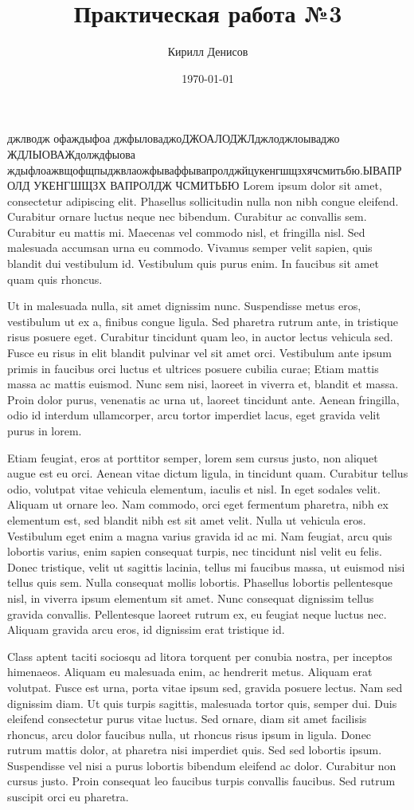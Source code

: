 \documentclass[a4paper,14pt]{extarticle}
\author{Кирилл Денисов}
\title{Практическая работа №3}
\date{\today}
\newcommand{\pathToCommonFolder}{/home/denilai/Desktop/LaTeX/Common}
\begin{document}
	\thispagestyle{empty}
	
	
	\newpage
	\tableofcontents
	\newpage
	
	джлводж офаждыфоа джфыловаджоДЖОАЛОДЖЛджлоджлоываджо ЖДЛЫОВАЖдолждфыова ждыфлоажвщофщпыджвлаожфываффывапролджйцукенгшщзхячсмитьбю.ЫВАПРОЛД УКЕНГШЩЗХ ВАПРОЛДЖ ЧСМИТЬБЮ 
Lorem ipsum dolor sit amet, consectetur adipiscing elit. Phasellus sollicitudin nulla non nibh congue eleifend. Curabitur ornare luctus neque nec bibendum. Curabitur ac convallis sem. Curabitur eu mattis mi. Maecenas vel commodo nisl, et fringilla nisl. Sed malesuada accumsan urna eu commodo. Vivamus semper velit sapien, quis blandit dui vestibulum id. Vestibulum quis purus enim. In faucibus sit amet quam quis rhoncus.

Ut in malesuada nulla, sit amet dignissim nunc. Suspendisse metus eros, vestibulum ut ex a, finibus congue ligula. Sed pharetra rutrum ante, in tristique risus posuere eget. Curabitur tincidunt quam leo, in auctor lectus vehicula sed. Fusce eu risus in elit blandit pulvinar vel sit amet orci. Vestibulum ante ipsum primis in faucibus orci luctus et ultrices posuere cubilia curae; Etiam mattis massa ac mattis euismod. Nunc sem nisi, laoreet in viverra et, blandit et massa. Proin dolor purus, venenatis ac urna ut, laoreet tincidunt ante. Aenean fringilla, odio id interdum ullamcorper, arcu tortor imperdiet lacus, eget gravida velit purus in lorem.

Etiam feugiat, eros at porttitor semper, lorem sem cursus justo, non aliquet augue est eu orci. Aenean vitae dictum ligula, in tincidunt quam. Curabitur tellus odio, volutpat vitae vehicula elementum, iaculis et nisl. In eget sodales velit. Aliquam ut ornare leo. Nam commodo, orci eget fermentum pharetra, nibh ex elementum est, sed blandit nibh est sit amet velit. Nulla ut vehicula eros. Vestibulum eget enim a magna varius gravida id ac mi. Nam feugiat, arcu quis lobortis varius, enim sapien consequat turpis, nec tincidunt nisl velit eu felis. Donec tristique, velit ut sagittis lacinia, tellus mi faucibus massa, ut euismod nisi tellus quis sem. Nulla consequat mollis lobortis. Phasellus lobortis pellentesque nisl, in viverra ipsum elementum sit amet. Nunc consequat dignissim tellus gravida convallis. Pellentesque laoreet rutrum ex, eu feugiat neque luctus nec. Aliquam gravida arcu eros, id dignissim erat tristique id.

Class aptent taciti sociosqu ad litora torquent per conubia nostra, per inceptos himenaeos. Aliquam eu malesuada enim, ac hendrerit metus. Aliquam erat volutpat. Fusce est urna, porta vitae ipsum sed, gravida posuere lectus. Nam sed dignissim diam. Ut quis turpis sagittis, malesuada tortor quis, semper dui. Duis eleifend consectetur purus vitae luctus. Sed ornare, diam sit amet facilisis rhoncus, arcu dolor faucibus nulla, ut rhoncus risus ipsum in ligula. Donec rutrum mattis dolor, at pharetra nisi imperdiet quis. Sed sed lobortis ipsum. Suspendisse vel nisi a purus lobortis bibendum eleifend ac dolor. Curabitur non cursus justo. Proin consequat leo faucibus turpis convallis faucibus. Sed rutrum suscipit orci eu pharetra.
\end{document}
